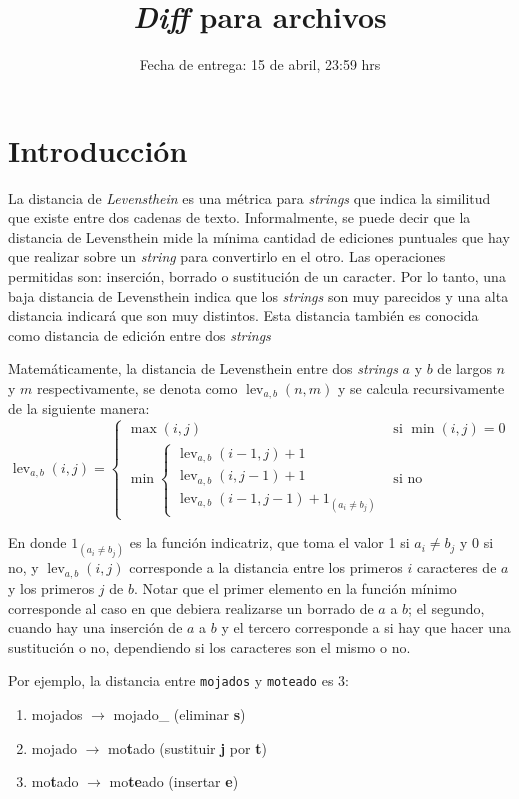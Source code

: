 \documentclass[dcc, usedate]{fcfmcourse}
\title[2]{\textit{Diff} para archivos}
\date{Fecha de entrega: 15 de abril, 23:59 hrs}
\DeclareMathOperator{\lev}{lev}
\begin{document}
\maketitle

\section{Introducción}
La distancia de \textit{Levensthein} es una métrica para \textit{strings} que indica la similitud que existe entre dos cadenas de texto. Informalmente, se puede decir que la distancia de Levensthein mide la mínima cantidad de ediciones puntuales que hay que realizar sobre un \textit{string} para convertirlo en el otro. Las operaciones permitidas son: inserción, borrado o sustitución de un caracter. Por lo tanto, una baja distancia de Levensthein indica que los \textit{strings} son muy parecidos y una alta distancia indicará que son muy distintos. Esta distancia también es conocida como distancia de edición entre dos \textit{strings}

Matemáticamente, la distancia de Levensthein entre dos \textit{strings} $a$ y $b$ de largos $n$ y $m$ respectivamente, se denota como $\lev_{a,b}(n,m)$ y se calcula recursivamente de la siguiente manera:
\[\lev_{a,b}(i,j) = 
\left\{
	\begin{array}{ll}
	\max(i,j) & \mbox{si } \min(i,j)=0\\
	\min \left\{
		\begin{array}{l}
			\lev_{a,b}(i-1,j)+1\\
			\lev_{a,b}(i,j-1)+1\\
			\lev_{a,b}(i-1,j-1) + 1_{(a_i \neq b_j)} 
		\end{array}   
	\right. & \mbox{si no}
	\end{array}
\right.
\]

En donde $1_{(a_i \neq b_j)}$ es la función indicatriz, que toma el valor 1 si $a_i \neq b_j$ y 0 si no, y $\lev_{a,b}(i,j)$ corresponde a la distancia entre los primeros $i$ caracteres de $a$ y los primeros $j$ de $b$. Notar que el primer elemento en la función mínimo corresponde al caso en que debiera realizarse un borrado de $a$ a $b$; el segundo, cuando hay una inserción de $a$ a $b$ y el tercero corresponde a si hay que hacer una sustitución o no, dependiendo si los caracteres son el mismo o no.

Por ejemplo, la distancia entre \texttt{mojados} y \texttt{moteado} es 3:
\begin{enumerate}
\setlength\itemsep{0em}
\item mojados $\rightarrow$ mojado\_ (eliminar \textbf{s})
\item mojado $\rightarrow$ mo\textbf{t}ado (sustituir \textbf{j} por \textbf{t})
\item mo\textbf{t}ado $\rightarrow$ mo\textbf{te}ado (insertar \textbf{e})
\end{enumerate}
\end{document}
